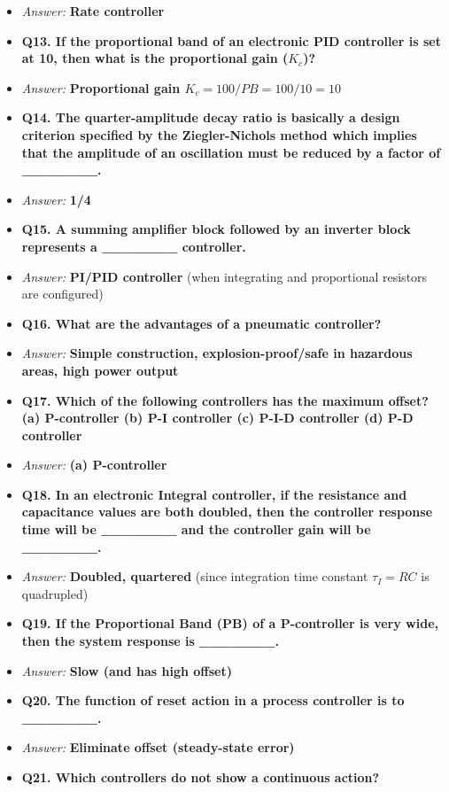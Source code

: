 \begin{itemize}
  \item \textit{Answer:} \textbf{Rate controller}
  \item \textbf{Q13. If the proportional band of an electronic PID controller is set at 10, then what is the proportional gain ($K_c$)?}
  \item \textit{Answer:} \textbf{Proportional gain $K_c = 100 / PB = 100/10 = 10$}
  \item \textbf{Q14. The quarter-amplitude decay ratio is basically a design criterion specified by the Ziegler-Nichols method which implies that the amplitude of an oscillation must be reduced by a factor of \_\_\_\_\_\_\_.}
  \item \textit{Answer:} \textbf{1/4}
  \item \textbf{Q15. A summing amplifier block followed by an inverter block represents a \_\_\_\_\_\_\_ controller.}
  \item \textit{Answer:} \textbf{PI/PID controller} (when integrating and proportional resistors are configured)
  \item \textbf{Q16. What are the advantages of a pneumatic controller?}
  \item \textit{Answer:} \textbf{Simple construction, explosion-proof/safe in hazardous areas, high power output}
  \item \textbf{Q17. Which of the following controllers has the maximum offset? (a) P-controller (b) P-I controller (c) P-I-D controller (d) P-D controller}
  \item \textit{Answer:} \textbf{(a) P-controller}
  \item \textbf{Q18. In an electronic Integral controller, if the resistance and capacitance values are both doubled, then the controller response time will be \_\_\_\_\_\_\_ and the controller gain will be \_\_\_\_\_\_\_.}
  \item \textit{Answer:} \textbf{Doubled, quartered} (since integration time constant $\tau_I = RC$ is quadrupled)
  \item \textbf{Q19. If the Proportional Band (PB) of a P-controller is very wide, then the system response is \_\_\_\_\_\_\_.}
  \item \textit{Answer:} \textbf{Slow (and has high offset)}
  \item \textbf{Q20. The function of reset action in a process controller is to \_\_\_\_\_\_\_.}
  \item \textit{Answer:} \textbf{Eliminate offset (steady-state error)}
  \item \textbf{Q21. Which controllers do not show a continuous action?}

\end{itemize}
